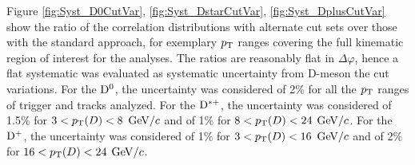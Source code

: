 Figure \ref{fig:Syst_D0CutVar}, \ref{fig:Syst_DstarCutVar}, \ref{fig:Syst_DplusCutVar} show the ratio of the correlation distributions with alternate cut sets over those with the standard approach, for exemplary $p_{\rm T}$ ranges covering the full kinematic region of interest for the analyses. The ratios are reasonably flat in $\Delta\varphi$, hence a flat systematic was evaluated as systematic uncertainty from D-meson the cut variations. For the ${\rm D^0}$, the uncertainty was considered of 2\% for all the $p_{\rm T}$ ranges of trigger and tracks analyzed. For the ${\rm D^{*+}}$, the uncertainty was considered of 1.5\% for $3 < p_{\rm T}(D) < 8$ $\mathrm{GeV}/c$ and of 1\% for $8 < p_{\rm T}(D) < 24$ $\mathrm{GeV}/c$. For the ${\rm D^+}$, the uncertainty was considered of 1\% for $3 < p_{\rm T}(D) < 16$ $\mathrm{GeV}/c$ and of 2\% for $16 < p_{\rm T}(D) < 24$ $\mathrm{GeV}/c$.
